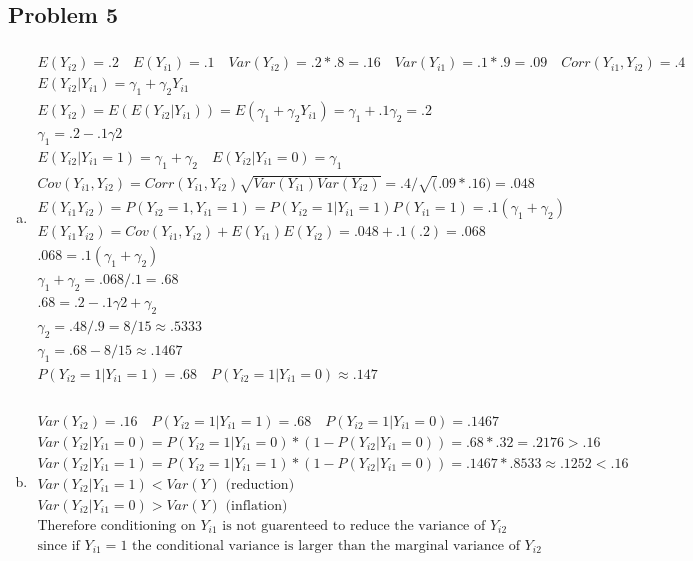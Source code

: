 \documentclass{article}
\newcommand{\ya}{Y_{i1}}
\newcommand{\yb}{Y_{i2}}
\begin{document}
\begin{flushleft}
\section*{Problem 5}
\begin{enumerate}[(a)]
\item
\begin{multline*}\\
E(\yb)=.2 \quad E(\ya)=.1 \quad Var(\yb)=.2*.8=.16 \quad Var(\ya)=.1*.9=.09 \quad Corr(\ya,\yb)=.4\\
E(\yb|\ya)=\gamma_1+\gamma_2 \ya\\
E(\yb)=E(E(\yb|\ya))=E(\gamma_1+\gamma_2 \ya)=\gamma_1+.1\gamma_2=.2\\
\gamma_1=.2-.1\gamma2\\
E(\yb|\ya=1)=\gamma_1+\gamma_2 \quad E(\yb|\ya=0)=\gamma_1\\
Cov(\ya,\yb)=Corr(\ya,\yb)\sqrt{Var(\ya)Var(\yb)}=.4/\sqrt(.09*.16)=.048\\
E(\ya \yb)=P(\yb=1,\ya=1)=P(\yb=1|\ya=1)P(\ya=1)=.1(\gamma_1+\gamma_2)\\
E(\ya \yb)=Cov(\ya,\yb)+E(\ya)E(\yb)=.048+.1(.2)=.068\\
.068=.1(\gamma_1+\gamma_2)\\
\gamma_1+\gamma_2=.068/.1=.68\\
.68=.2-.1\gamma2+\gamma_2\\
\gamma_2=.48/.9=8/15\approx .5333 \\
\gamma_1=.68-8/15\approx .1467\\
P(\yb=1|\ya=1)=.68 \quad P(\yb=1|\ya=0)\approx.147 \\
\end{multline*}
\item
\begin{multline*}\\
Var(\yb)=.16 \quad P(\yb=1|\ya=1)=.68 \quad P(\yb=1|\ya=0)=.1467\\
Var(\yb|\ya=0)=P(\yb=1|\ya=0)*(1-P(\yb|\ya=0))=.68*.32=.2176>.16\\
Var(\yb|\ya=1)=P(\yb=1|\ya=1)*(1-P(\yb|\ya=0))=.1467*.8533\approx.1252<.16\\
Var(\yb|\ya=1)<Var(Y) \text{ (reduction)}\\
Var(\yb|\ya=0)>Var(Y) \text{ (inflation)}\\
\text{Therefore conditioning on } \ya \text{ is not guarenteed to reduce the variance of } \yb\\
\text{since if } \ya=1 \text{ the conditional variance is larger than the marginal variance of } \yb\\ 

\end{multline*}
\end{enumerate}
\end{flushleft}
\end{document}
